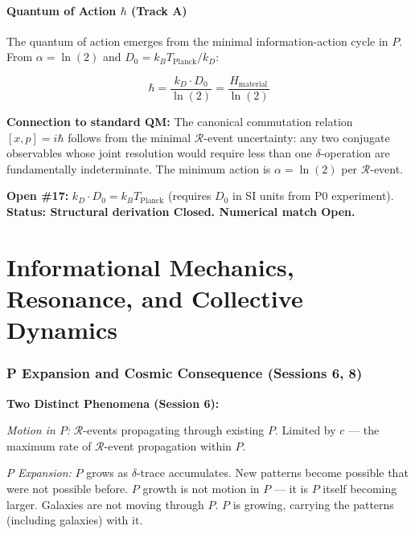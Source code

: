 \documentclass[12pt, a4paper]{article}
\begin{document}
\subsection{Quantum of Action $\hbar$ (Track A)}

\begin{derivedbox}[title={$\hbar$ from Vacuum Information Scale $D_0$}]
The quantum of action emerges from the minimal information-action cycle in $P$. From
$\alpha = \ln(2)$ and $D_0 = k_B T_{\mathrm{Planck}}/k_D$:

\[
  \hbar = \frac{k_D\cdot D_0}{\ln(2)} = \frac{H_{\mathrm{material}}}{\ln(2)}
\]

\textbf{Connection to standard QM:} The canonical commutation relation $[x, p] = i\hbar$
follows from the minimal $\mathcal{R}$-event uncertainty: any two conjugate observables
whose joint resolution would require less than one $\delta$-operation are fundamentally
indeterminate. The minimum action is $\alpha = \ln(2)$ per $\mathcal{R}$-event.

\textbf{Open \#17:} $k_D\cdot D_0 = k_B T_{\mathrm{Planck}}$ (requires $D_0$ in SI
units from P0 experiment). \textbf{Status: Structural derivation Closed. Numerical match Open.}
\end{derivedbox}

\part{Informational Mechanics, Resonance, and Collective Dynamics}

\section{P Expansion and Cosmic Consequence (Sessions 6, 8)}

\textbf{Two Distinct Phenomena (Session 6):}

\textit{Motion in $P$:} $\mathcal{R}$-events propagating through existing $P$. Limited by
$c$ --- the maximum rate of $\mathcal{R}$-event propagation within $P$.

\textit{$P$ Expansion:} $P$ grows as $\delta$-trace accumulates. New patterns become
possible that were not possible before. $P$ growth is not motion in $P$ --- it is $P$
itself becoming larger. Galaxies are not moving through $P$. $P$ is growing, carrying
the patterns (including galaxies) with it.
\end{document}
